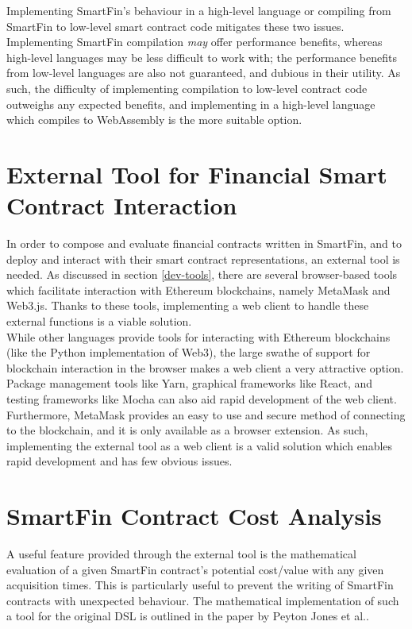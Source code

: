 Implementing SmartFin's behaviour in a high-level language or compiling from SmartFin to low-level smart contract code mitigates these two issues. Implementing SmartFin compilation \textit{may} offer performance benefits, whereas high-level languages may be less difficult to work with; the performance benefits from low-level languages are also not guaranteed, and dubious in their utility. As such, the difficulty of implementing compilation to low-level contract code outweighs any expected benefits, and implementing in a high-level language which compiles to WebAssembly is the more suitable option.


\section{External Tool for Financial Smart Contract Interaction}

In order to compose and evaluate financial contracts written in SmartFin, and to deploy and interact with their smart contract representations, an external tool is needed. As discussed in section \ref{dev-tools}, there are several browser-based tools which facilitate interaction with Ethereum blockchains, namely MetaMask and Web3.js. Thanks to these tools, implementing a web client to handle these external functions is a viable solution. \\

While other languages provide tools for interacting with Ethereum blockchains (like the Python implementation of Web3\cite{web3-py}), the large swathe of support for blockchain interaction in the browser makes a web client a very attractive option. Package management tools like Yarn\cite{yarn}, graphical frameworks like React\cite{react}, and testing frameworks like Mocha\cite{mocha} can also aid rapid development of the web client. Furthermore, MetaMask provides an easy to use and secure method of connecting to the blockchain, and it is only available as a browser extension\cite{MMSK}. As such, implementing the external tool as a web client is a valid solution which enables rapid development and has few obvious issues.


\section{SmartFin Contract Cost Analysis} \label{cost-analysis}

A useful feature provided through the external tool is the mathematical evaluation of a given SmartFin contract's potential cost/value with any given acquisition times. This is particularly useful to prevent the writing of SmartFin contracts with unexpected behaviour. The mathematical implementation of such a tool for the original DSL is outlined in the paper by Peyton Jones et al.\cite{SPJ}. \\

